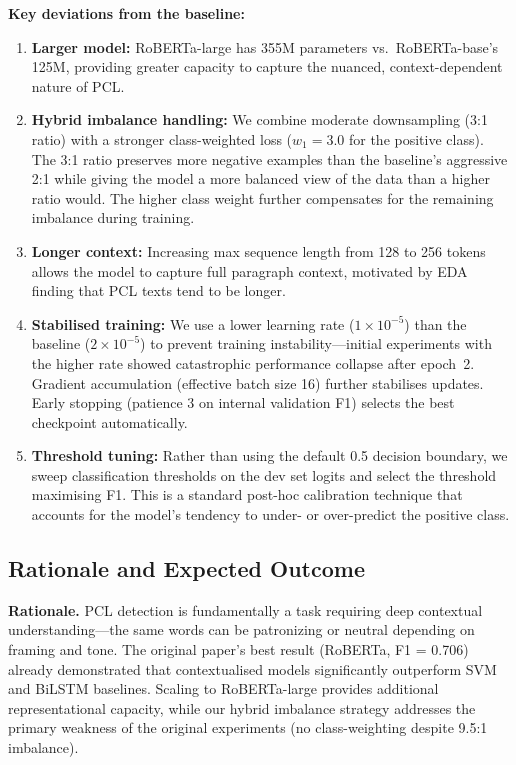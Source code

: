 \documentclass[11pt,a4paper]{article}
\begin{document}
\textbf{Key deviations from the baseline:}
\begin{enumerate}[leftmargin=*]
    \item \textbf{Larger model:} RoBERTa-large has 355M parameters vs.\
          RoBERTa-base's 125M, providing greater capacity to capture the
          nuanced, context-dependent nature of PCL.
    \item \textbf{Hybrid imbalance handling:} We combine moderate
          downsampling (3:1 ratio) with a stronger class-weighted loss
          ($w_1 = 3.0$ for the positive class). The 3:1 ratio preserves
          more negative examples than the baseline's aggressive 2:1 while
          giving the model a more balanced view of the data than a higher
          ratio would. The higher class weight further compensates for the
          remaining imbalance during training.
    \item \textbf{Longer context:} Increasing max sequence length from 128
          to 256 tokens allows the model to capture full paragraph context,
          motivated by EDA finding that PCL texts tend to be longer.
    \item \textbf{Stabilised training:} We use a lower learning rate
          ($1 \times 10^{-5}$) than the baseline ($2 \times 10^{-5}$) to
          prevent training instability---initial experiments with the higher
          rate showed catastrophic performance collapse after epoch~2.
          Gradient accumulation (effective batch size 16) further stabilises
          updates. Early stopping (patience 3 on internal validation F1)
          selects the best checkpoint automatically.
    \item \textbf{Threshold tuning:} Rather than using the default 0.5
          decision boundary, we sweep classification thresholds on the dev
          set logits and select the threshold maximising F1. This is a
          standard post-hoc calibration technique that accounts for the
          model's tendency to under- or over-predict the positive class.
\end{enumerate}

\subsection{Rationale and Expected Outcome}

\textbf{Rationale.} PCL detection is fundamentally a task requiring deep
contextual understanding---the same words can be patronizing or neutral
depending on framing and tone. The original paper's best result
(RoBERTa, F1 = 0.706) already demonstrated that contextualised models
significantly outperform SVM and BiLSTM baselines. Scaling to
RoBERTa-large provides additional representational capacity, while our
hybrid imbalance strategy addresses the primary weakness of the original
experiments (no class-weighting despite 9.5:1 imbalance).
\end{document}
